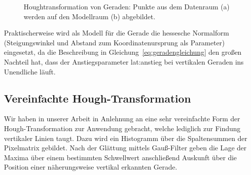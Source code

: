 \begin{figure}[htbp] %
  \centering  
  \qquad
  \caption{Houghtransformation von Geraden: Punkte aus dem Datenraum (a) werden auf den Modellraum (b) abgebildet.}
\end{figure} 

Praktischerweise wird als Modell für die Gerade die hessesche Normalform (Steigungswinkel und Abstand zum Koordinatenursprung als Parameter) eingesetzt, da die Beschreibung in Gleichung~\eqref{eq:geradengleichung} den großen Nachteil hat, dass der Anstiegsparameter \gls{lat:anstieg} bei vertikalen Geraden ins Unendliche läuft. 

\subsection{Vereinfachte Hough-Transformation}
\label{ssec:grundlagen:hough:vereinfachte}
Wir haben in unserer Arbeit in Anlehnung an \autocite{alyRealTimeDetection2008} eine sehr vereinfachte Form der Hough-Transformation zur Anwendung gebracht, welche lediglich zur Findung vertikaler Linien taugt. Dazu wird ein Histogramm über die Spaltensummen der Pixelmatrix gebildet. Nach der Glättung mittels Gauß-Filter geben die Lage der Maxima über einem bestimmten Schwellwert anschließend Auskunft über die Position einer näherungsweise vertikal erkannten Gerade.

